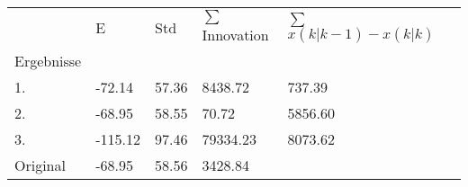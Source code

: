     \begin{tabular}{l|l|l|l|l|l}

               & E         & Std      & \(\sum\) Innovation & \(\sum\) \(x(k|k-1)-x(k|k)\) & & \\
    \hhline{=|=|=|=|=|=}

    Ergebnisse &           &          &            & \\
    1.         &       -72.14  &        57.36 &      8438.72   &       737.39 \\
    2.         &       -68.95  &        58.55 &        70.72   &      5856.60 \\
    3.         &      -115.12  &        97.46 &     79334.23   &      8073.62 \\
    \hline
    Original   &       -68.95 &        58.56 &      3428.84 & & \\
    \end{tabular}
